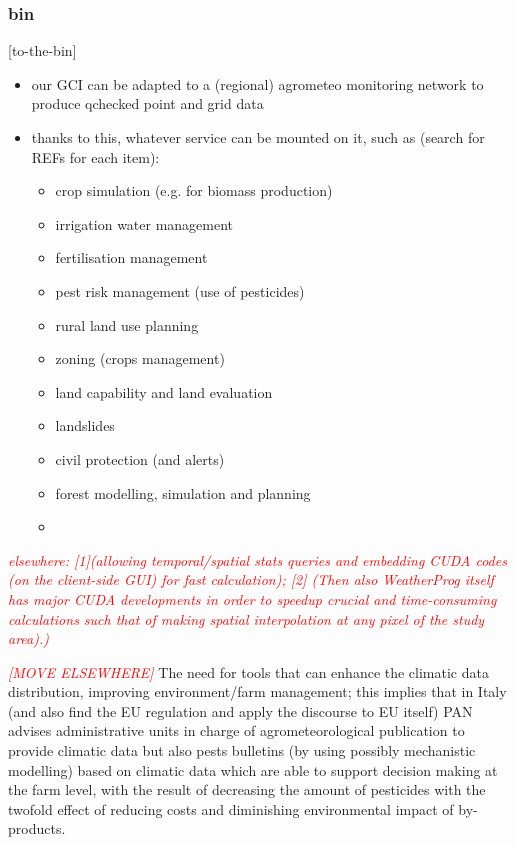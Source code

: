 \documentclass[authoryear,preprint,review,12pt]{elsarticle}
\newcommand{\note}[1]{\emph{\textcolor{red}{#1}}}
\begin{document}
\subsubsection{bin}[to-the-bin]
\begin{itemize}
    \item our GCI can be adapted to a (regional) agrometeo monitoring network to produce qchecked point and grid data
    \item thanks to this, whatever service can be mounted on it, such as (search for REFs for each item):
    \begin{itemize}
        \item crop simulation (e.g. for biomass production)
        \item irrigation water management
        \item fertilisation management
        \item pest risk management (use of pesticides)
        \item rural land use planning
        \item zoning (crops management)
        \item land capability and land evaluation
        \item landslides
        \item civil protection (and alerts)
        \item forest modelling, simulation and planning
        \item 
    \end{itemize}
\end{itemize}

\note{ elsewhere: [1](allowing temporal/spatial stats queries and embedding CUDA codes (on the client-side GUI) for fast calculation); [2] (Then also WeatherProg itself has major CUDA developments in order to speedup crucial and time-consuming calculations such that of making spatial interpolation at any pixel of the study area).) }

\note{[MOVE ELSEWHERE]} The need for tools that can enhance the climatic data distribution, improving environment/farm management; this implies that in Italy (and also find the EU regulation and apply the discourse to EU itself) PAN advises administrative units in charge of agrometeorological publication to provide climatic data but also pests bulletins (by using possibly mechanistic modelling) based on climatic data which are able to support decision making at the farm level, with the result of decreasing the amount of pesticides with the twofold effect of reducing costs and diminishing environmental impact of by-products.
\end{document}
